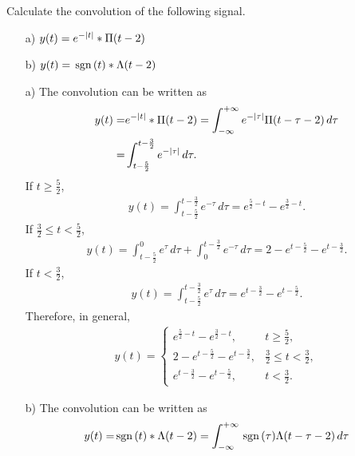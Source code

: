 \documentclass{assignment}
\begin{document}
\begin{prob}[10 pts]
    Calculate the convolution of the following signal.
    \begin{itemize}
        \item[a)] $y(t)=e^{-\left\lvert t\right\rvert}*\Pi(t-2)$
        \item[b)] $y(t)=\,\text{sgn}\,(t)*\Lambda(t-2)$
    \end{itemize}
\end{prob}
\begin{sol}
    \begin{itemize}
        \item[a)] The convolution can be written as
        \begin{align}
            \notag y(t)=&e^{-\left\lvert t\right\rvert}*\Pi(t-2)=\int_{-\infty}^{+\infty}e^{-\left\lvert\tau\right\rvert}\Pi(t-\tau-2)\,d\tau\\
            =&\int_{t-\frac{5}{2}}^{t-\frac{3}{2}}e^{-\left\lvert\tau\right\rvert}\,d\tau.
        \end{align}
        If $t\geq \frac{5}{2}$,
        \begin{align}
            y(t)=\int_{t-\frac{5}{2}}^{t-\frac{3}{2}}e^{-\tau}\,d\tau=e^{\frac{5}{2}-t}-e^{\frac{3}{2}-t}.
        \end{align}
        If $\frac{3}{2}\leq t<\frac{5}{2}$,
        \begin{align}
            y(t)=\int_{t-\frac{5}{2}}^0e^{\tau}\,d\tau+\int_0^{t-\frac{3}{2}}e^{-\tau}\,d\tau=2-e^{t-\frac{5}{2}}-e^{t-\frac{3}{2}}.
        \end{align}
        If $t<\frac{3}{2}$,
        \begin{align}
            y(t)=\int_{t-\frac{5}{2}}^{t-\frac{3}{2}}e^{\tau}\,d\tau=e^{t-\frac{3}{2}}-e^{t-\frac{5}{2}}.
        \end{align}
        Therefore, in general,
        \begin{align}
            y(t)=\left\{\begin{array}{ll}
                e^{\frac{5}{2}-t}-e^{\frac{3}{2}-t},&t\geq\frac{5}{2},\\
                2-e^{t-\frac{5}{2}}-e^{t-\frac{3}{2}},&\frac{3}{2}\leq t<\frac{3}{2},\\
                e^{t-\frac{3}{2}}-e^{t-\frac{5}{2}},&t<\frac{3}{2}.
            \end{array}\right.
        \end{align}
        \item[b)] The convolution can be written as
        \begin{align}
            \notag y(t)=&\sgn(t)*\Lambda(t-2)=\int_{-\infty}^{+\infty}\sgn(\tau)\Lambda(t-\tau-2)\,d\tau\\

\end{align}
\end{itemize}
\end{sol}
\end{document}
